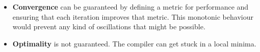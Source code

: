 \begin{itemize}
    \item \textbf{Convergence} can be guaranteed by defining a metric for performance and ensuring that each iteration improves that metric. This monotonic behaviour would prevent any kind of oscillations that might be possible.
    \item \textbf{Optimality} is not guaranteed. The compiler can get stuck in a local minima.
\end{itemize}
